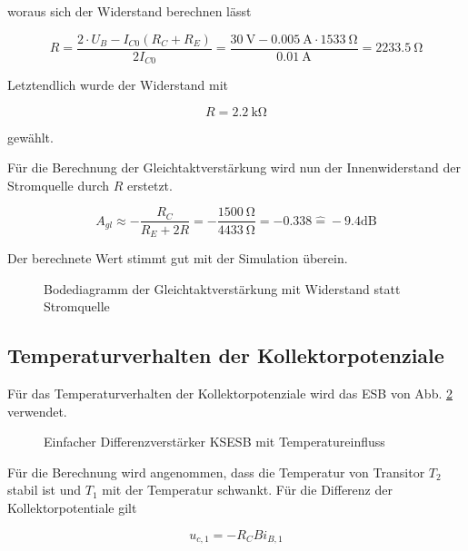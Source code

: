 woraus sich der Widerstand berechnen lässt

\begin{equation}
    R = \frac{2\cdot U_B - I_{C0} (R_C + R_E)}{2 I_{C0} } = \frac{\SI{30}{\volt} - \SI{0.005}{\ampere} \cdot \SI{1533}{\ohm}}{\SI{0,01}{\ampere}} = \SI{2233,5}{\ohm} 
\end{equation}

Letztendlich wurde der Widerstand mit

\begin{equation}
    R = \SI{2.2}{\kilo\ohm}
\end{equation}

gewählt.

Für die Berechnung der Gleichtaktverstärkung wird nun der Innenwiderstand der Stromquelle durch $R$ erstetzt.

\begin{equation}
    A_{gl} \approx -\frac{R_C}{R_E + 2R} = -\frac{\SI{1500}{\ohm}}{\SI{4433}{\ohm}} = -0.338 \hat{ = } -9.4 \text{dB}
\end{equation}

Der berechnete Wert stimmt gut mit der Simulation überein.

\begin{figure}[H]
	\centering \small
	\scalebox{0.9}{}
	\caption{Bodediagramm der Gleichtaktverstärkung mit Widerstand statt Stromquelle}
	\label{fig_Kap5_06:Bode}
\end{figure}

\subsection{Temperaturverhalten der Kollektorpotenziale}
Für das Temperaturverhalten der Kollektorpotenziale wird das ESB von Abb. \ref{fig_Kap5_07:Temp} verwendet.

\begin{figure}[H]
	\centering
	\def\svgwidth{0.9\textwidth}
	
	\caption{Einfacher Differenzverstärker KSESB mit Temperatureinfluss} 
	\label{fig_Kap5_07:Temp} 
\end{figure}

Für die Berechnung wird angenommen, dass die Temperatur von Transitor $T_2$ stabil ist und $T_1$ mit der Temperatur schwankt.  Für die Differenz der Kollektorpotentiale gilt

\begin{equation}
    u_{c,1} = -R_C B i_{B,1}
\end{equation}

